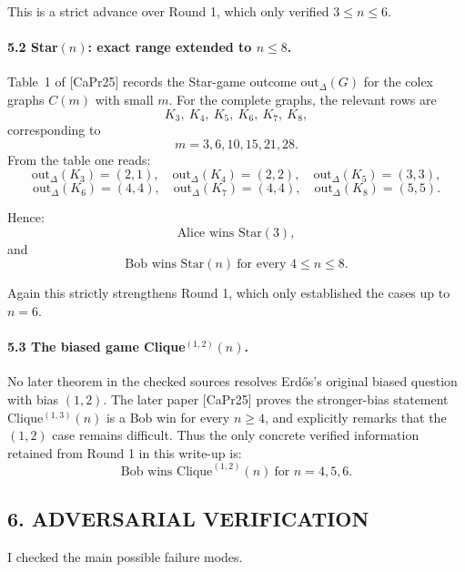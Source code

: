 This is a strict advance over Round 1, which only verified $3 \leq n \leq 6$.

\paragraph{5.2 Star$(n)$: exact range extended to $n \leq 8$.}

Table~1 of [CaPr25] records the Star-game outcome $\mathrm{out}_{\Delta}(G)$ for the colex graphs $C(m)$ with small $m$. For the complete graphs, the relevant rows are
\[
K_3,\ K_4,\ K_5,\ K_6,\ K_7,\ K_8,
\]
corresponding to
\[
m=3,6,10,15,21,28.
\]
From the table one reads:
\[
\mathrm{out}_{\Delta}(K_3)=(2,1),\quad
\mathrm{out}_{\Delta}(K_4)=(2,2),\quad
\mathrm{out}_{\Delta}(K_5)=(3,3),
\]
\[
\mathrm{out}_{\Delta}(K_6)=(4,4),\quad
\mathrm{out}_{\Delta}(K_7)=(4,4),\quad
\mathrm{out}_{\Delta}(K_8)=(5,5).
\]

Hence:
\[
\mbox{Alice wins Star}(3),
\]
and
\[
\mbox{Bob wins Star}(n)\ \mbox{for every } 4 \leq n \leq 8.
\]

Again this strictly strengthens Round 1, which only established the cases up to $n=6$.

\paragraph{5.3 The biased game Clique$^{(1,2)}(n)$.}

No later theorem in the checked sources resolves Erd\H{o}s's original biased question with bias $(1,2)$. The later paper [CaPr25] proves the stronger-bias statement Clique$^{(1,3)}(n)$ is a Bob win for every $n \geq 4$, and explicitly remarks that the $(1,2)$ case remains difficult. Thus the only concrete verified information retained from Round 1 in this write-up is:
\[
\mbox{Bob wins Clique}^{(1,2)}(n)\ \mbox{for } n=4,5,6.
\]

\subsection*{6. ADVERSARIAL VERIFICATION}

I checked the main possible failure modes.

